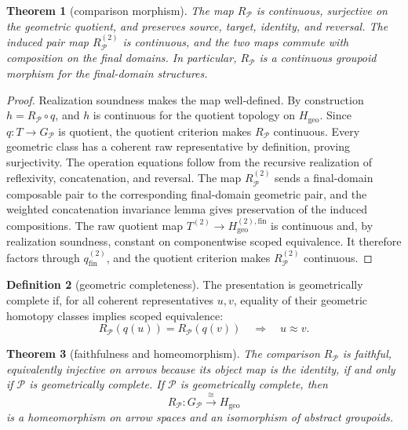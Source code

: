 \documentclass[10pt,reqno]{amsart}
\theoremstyle{definition}
\newtheorem{definition}{Definition}[section]
\theoremstyle{plain}
\newtheorem{theorem}[definition]{Theorem}
\theoremstyle{remark}
\newcommand{\Fin}{\mathrm{fin}}
\begin{document}
\begin{theorem}[comparison morphism]
The map $R_{\mathcal P}$ is continuous, surjective on the geometric quotient,
and preserves source, target, identity, and reversal.
The induced pair map $R_{\mathcal P}^{(2)}$ is continuous, and the two maps
commute with composition on the final domains.  In particular,
$R_{\mathcal P}$ is a continuous groupoid morphism for the final-domain
structures.
\end{theorem}

\begin{proof}
Realization soundness makes the map well-defined.  By construction
$h=R_{\mathcal P}\circ q$, and $h$ is continuous for the quotient topology on
$H_{\mathrm{geo}}$.  Since $q:T\to G_{\mathcal P}$ is quotient, the quotient
criterion makes $R_{\mathcal P}$ continuous.  Every geometric class has a
coherent raw representative by definition, proving surjectivity.  The
operation equations follow from the recursive realization of reflexivity,
concatenation, and reversal.  The map $R_{\mathcal P}^{(2)}$ sends a
final-domain composable pair to the corresponding final-domain geometric pair,
and the weighted concatenation invariance lemma gives preservation of the
induced compositions.  The raw quotient map
$T^{(2)}\to H_{\mathrm{geo}}^{(2),\Fin}$ is continuous and, by realization
soundness, constant on componentwise scoped equivalence.  It therefore
factors through $q_{\mathrm{fin}}^{(2)}$, and the quotient criterion makes
$R_{\mathcal P}^{(2)}$ continuous.
\end{proof}

\begin{definition}[geometric completeness]
The presentation is geometrically complete if, for all coherent representatives
$u,v$, equality of their geometric homotopy classes implies scoped equivalence:
\[
  R_{\mathcal P}(q(u))=R_{\mathcal P}(q(v))
  \quad\Longrightarrow\quad u\approx v.
\]
\end{definition}

\begin{theorem}[faithfulness and homeomorphism]
\label{thm:faithfulness-homeomorphism}
The comparison $R_{\mathcal P}$ is faithful, equivalently injective on arrows
because its object map is the identity, if and only if $\mathcal P$ is
geometrically complete.  If $\mathcal P$ is geometrically complete, then
\[
  R_{\mathcal P}:G_{\mathcal P}\xrightarrow{\ \cong\ }H_{\mathrm{geo}}
\]
is a homeomorphism on arrow spaces and an isomorphism of abstract groupoids.
\end{theorem}
\end{document}
